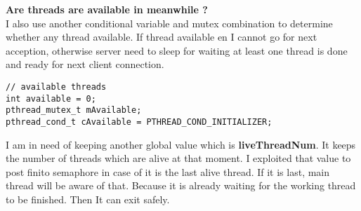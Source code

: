 \documentclass{article}
\begin{document}
\textbf{Are threads are available in meanwhile ?}\\
I also use another conditional variable and mutex combination to determine whether any thread available. If thread available en I cannot go for next acception, otherwise server need to sleep for waiting at least one thread is done and ready for next client connection. 
\begin{lstlisting}[style=CStyle]
// available threads
int available = 0;
pthread_mutex_t mAvailable;
pthread_cond_t cAvailable = PTHREAD_COND_INITIALIZER;
\end{lstlisting}
I am in need of keeping another global value which is \textbf{liveThreadNum}. It keeps the number of threads which are alive at that moment. I exploited that value to post finito semaphore in case of it is the last alive thread. If it is last, main thread will be aware of that. Because it is already waiting for the working thread to be finished. Then It can exit safely.
\end{document}
